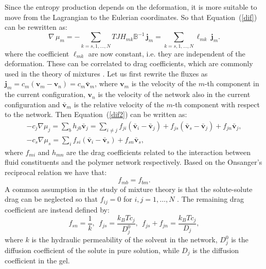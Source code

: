 Since the entropy production depends on the deformation, it is more suitable to move from the Lagrangian to the Eulerian coordinates. So that Equation~(\ref{dif}) can be rewritten as:
\begin{equation}
\nabla \,\mu_m  = - \sum_{k=s,1,\ldots,N} T J H_{mk} \mathbb{B}^{-1} \, \mathbf{j}_m= \sum_{k=s,1,\ldots,N} \ell_{mk}\   \mathbf{j}_m. \label{dif2}
\end{equation}
where the coefficient $\ell_{mk}$ are now constant, i.e. they are independent of the deformation. These can be correlated to drag coefficients, which are commonly used in the theory of mixtures \cite{ecm1,ecm2}. Let us first rewrite the fluxes as $\mathbf{j}_m = c_m (\mathbf{v}_m-\mathbf{v}_n)= c_m \bar{\mathbf{v}}_{m}$, where $\mathbf{v}_m$ is the velocity of the $m$-th component in the current configuration, $\mathbf{v}_n$ is the velocity of the network also in the current configuration and  $\bar{\mathbf{v}}_{m}$ is the relative velocity of the $m$-th component with respect to the network. Then Equation~(\ref{dif2}) can be written as:
\begin{eqnarray}
-c_j \nabla \mu_j = \sum_b h_{jb} \bar{\mathbf{v}}_j= \sum_{i\neq j} f_{ji} \left(\bar{\mathbf{v}}_i-\bar{\mathbf{v}}_j\right) + f_{js} (\bar{\mathbf{v}}_s-\bar{\mathbf{v}}_j) + f_{jn} \bar{\mathbf{v}}_j,\label{drag1}\\
-c_s \nabla \mu_s = \sum_i f_{si} \left(\bar{\mathbf{v}}_i-\bar{\mathbf{v}}_s\right)+ f_{sn} \bar{\mathbf{v}}_s,
\end{eqnarray}
where $f_{mi}$ and $h_{mn}$ are the drag coefficients related to the interaction between fluid constituents and the polymer network respectively. Based on the Onsanger's reciprocal relation we have that:
\begin{equation}
f_{mb}=f_{bm}.
\end{equation}
A common assumption in the study of mixture theory is that the solute-solute drag can be neglected so that $f_{ij}=0$ for $i,j=1,\ldots,N$ \cite{ecm1,bookbiophys}. The remaining drag coefficient are instead defined by:
\begin{equation}
f_{sn} = \frac{1}{k}, \ \ f_{js}=\frac{k_BT c_j}{D^0_{j}},\ \  f_{js}+f_{jn}= \frac{k_BT c_j}{D_j}, \label{drag2}
\end{equation}
where $k$ is the hydraulic permeability of the solvent in the network, $D^0_j$ is the diffusion coefficient of the solute in pure solution, while $D_j$ is the diffusion coefficient in the gel.


